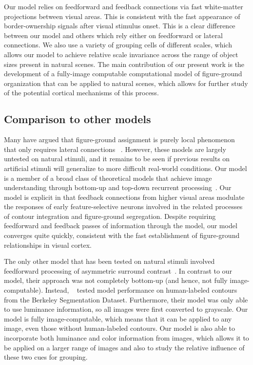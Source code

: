 Our model relies on feedforward and feedback connections via fast white-matter projections between visual areas. This is consistent with the fast appearance of border-ownership signals after visual stimulus onset. This is a clear difference between our model and others which rely either on feedforward or lateral connections. We also use a variety of grouping cells of different scales, which allows our model to achieve relative scale invariance across the range of object sizes present in natural scenes. The main contribution of our present work is the development of a fully-image computable computational model of figure-ground organization that can be applied to natural scenes, which allows for further study of the potential cortical mechanisms of this process.

%
\subsection{Comparison to other models}
Many have argued that figure-ground assignment is purely local phenomenon
that only requires lateral connections
~\citep{Grossberg94, Grossberg97, Zhaoping05}. However, these models are largely untested on natural stimuli, and it remains to be seen if previous results on artificial stimuli will generalize to more difficult real-world conditions.
Our model is a member of a broad class of theoretical models that
achieve image understanding through bottom-up and top-down recurrent
processing~\citep{Ullman84,Hochstein_Ahissar02,Roelfsema_06,Epshtein_etal08}.
Our model is explicit in that feedback connections from higher visual areas
modulate the responses of early feature-selective neurons involved in
the related processes of contour integration and figure-ground
segregation. Despite requiring feedforward and feedback passes of information through
the model, our model converges quite quickly, consistent with the fast establishment of figure-ground relationships in visual cortex. 
%

The only other model that has been tested on natural stimuli involved feedforward processing of asymmetric surround contrast~\citep{Nishimura_Sakai05,Sakai_etal12}.
In contrast to our model, their approach was not completely bottom-up (and hence, not fully image-computable). Instead, ~\citet{Sakai_etal12} tested model performance on human-labeled contours from the Berkeley Segmentation Dataset. Furthermore, their model was only able to use luminance information, so all images were first converted to grayscale. Our model is fully image-computable, which  means that it can be applied to any image, even those without human-labeled contours. Our model is also able to incorporate both luminance and color information from images, which allows it to be applied on a larger range of images and also to study the relative influence of these two cues for grouping.

